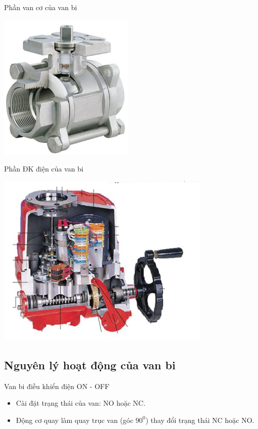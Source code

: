 \documentclass[20pt]{beamer}
\begin{document}
\begin{frame}{Phần van cơ của van bi}
\vspace{-.5cm}
\begin{center}
	\includegraphics[scale=.7]{images/phan-co-van-bi.png} 
\end{center}
\end{frame}

\begin{frame}{Phần ĐK điện của van bi}
\vspace{-.5cm}
\begin{center}
	\includegraphics[scale=.6]{images/phan-dien-van-bi.png} 
\end{center}
\end{frame}

\subsection*{Nguyên lý hoạt động của van bi}
\begin{frame}{Van bi điều khiển điện ON - OFF}
\begin{itemize}
\justifying
	\item Cài đặt trạng thái của van: NO hoặc NC.
	\item Động cơ quay làm quay trục van (góc $90^0$) thay đổi trạng thái NC hoặc NO.
\end{itemize}
\end{frame}
\end{document}
